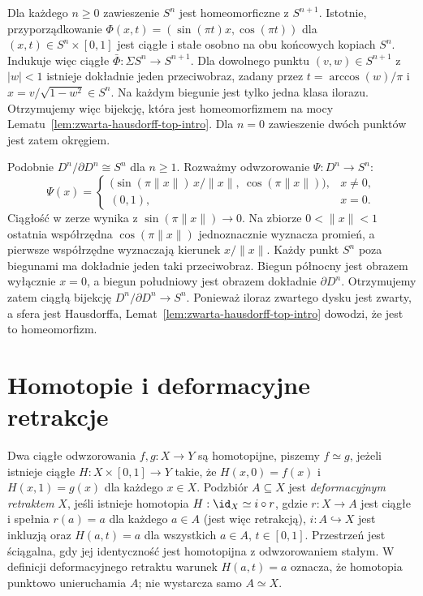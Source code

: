 \begin{przyklad}
Dla każdego $n\geq0$ zawieszenie $S^n$ jest
homeomorficzne z $S^{n+1}$.
Istotnie, przyporządkowanie
$\Phi(x,t)=(\sin(\pi t)x,\cos(\pi t))$ dla
$(x,t)\in S^n\times[0,1]$
jest ciągłe i stałe osobno na obu końcowych kopiach
$S^n$. Indukuje więc ciągłe
$\bar\Phi:\Sigma S^n\to S^{n+1}$.
Dla dowolnego punktu $(v,w)\in S^{n+1}$ z $|w|<1$
istnieje dokładnie jeden przeciwobraz, zadany przez
$t=\arccos(w)/\pi$ i $x=v/\sqrt{1-w^2}\in S^n$.
Na każdym biegunie jest tylko jedna klasa ilorazu.
Otrzymujemy więc bijekcję,
która jest homeomorfizmem na mocy
Lematu~\ref{lem:zwarta-hausdorff-top-intro}.
Dla $n=0$ zawieszenie dwóch punktów jest zatem okręgiem.

Podobnie $D^n/\partial D^n\cong S^n$ dla $n\geq1$.
Rozważmy odwzorowanie $\Psi:D^n\to S^n$:
\[
\Psi(x)=
\begin{cases}
\bigl(\sin(\pi\|x\|)\,x/\|x\|,\ \cos(\pi\|x\|)\bigr),
  & x\ne0,\\
(0,1), & x=0.
\end{cases}
\]
Ciągłość w zerze wynika z $\sin(\pi\|x\|)\to0$.
Na zbiorze $0<\|x\|<1$ ostatnia współrzędna
$\cos(\pi\|x\|)$ jednoznacznie wyznacza promień,
a pierwsze współrzędne wyznaczają kierunek $x/\|x\|$.
Każdy punkt $S^n$ poza biegunami ma dokładnie jeden taki
przeciwobraz. Biegun północny jest obrazem wyłącznie $x=0$,
a biegun południowy jest obrazem dokładnie $\partial D^n$.
Otrzymujemy zatem ciągłą bijekcję $D^n/\partial D^n\to S^n$.
Ponieważ iloraz zwartego dysku jest zwarty, a sfera jest
Hausdorffa, Lemat~\ref{lem:zwarta-hausdorff-top-intro}
dowodzi, że jest to homeomorfizm.
\end{przyklad}

\section{Homotopie i deformacyjne retrakcje}

\begin{definicja}
Dwa ciągłe odwzorowania $f,g:X\to Y$ są homotopijne, piszemy
$f\simeq g$, jeżeli istnieje ciągłe $H:X\times[0,1]\to Y$ takie, że
$H(x,0)=f(x)$ i $H(x,1)=g(x)$ dla każdego $x\in X$.
Podzbiór $A\subseteq X$ jest \emph{deformacyjnym retraktem} $X$, jeśli
istnieje homotopia $H:\id_X\simeq i\circ r$, gdzie $r:X\to A$ jest ciągłe i spełnia $r(a)=a$ dla
każdego $a\in A$ (jest więc retrakcją),
$i:A\hookrightarrow X$ jest inkluzją oraz
$H(a,t)=a$ dla wszystkich $a\in A$, $t\in[0,1]$.
Przestrzeń jest ściągalna, gdy jej identyczność jest homotopijna z
odwzorowaniem stałym. W definicji deformacyjnego retraktu
warunek $H(a,t)=a$ oznacza, że homotopia punktowo unieruchamia $A$;
nie wystarcza samo $A\simeq X$.
\end{definicja}


